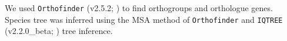 \documentclass[11pt, a4paper]{article}
\begin{document}
We used \texttt{Orthofinder} (v2.5.2; \cite{Emms2015, Emms2019}) to find orthogroups and orthologue genes.
Species tree was inferred using the MSA method of \texttt{Orthofinder} \parencite{Emms2018} and \texttt{IQTREE} (v2.2.0\_beta; \cite{Minh2020}) tree inference.

\end{document}
